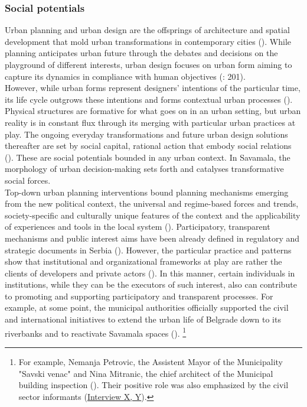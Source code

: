 \documentclass[11pt]{report}
\begin{document}
\subsubsection{Social potentials}

Urban planning and urban design are the offsprings of architecture and spatial development that mold urban transformations in contemporary cities (\citealt{rode_city_2006}).
While planning anticipates urban future through the debates and decisions on the playground of different interests, urban design focuses on urban form aiming to capture its dynamics in compliance with human objectives (\citealt{lynch_theory_1958}: 201).
\\

However, while urban forms represent designers' intentions of the particular time, its life cycle outgrows these intentions and forms contextual urban processes (\citealt{tonkiss_cities_2014}).
Physical structures are formative for what goes on in an urban setting, but urban reality is in constant flux through its merging with particular urban practices at play.
The ongoing everyday transformations and future urban design solutions thereafter are set by social capital, rational action that embody social relations (\citealt{coleman_social_1988}).
These are social potentials bounded in any urban context.
In Savamala, the morphology of urban decision-making sets forth and catalyses transformative social forces.
\\

Top-down urban planning interventions bound planning mechanisms emerging from the new political context, the universal and regime-based forces and trends, society-specific and culturally unique features of the context and the applicability of experiences and tools in the local system (\citealt{nedovic-budic_adjustment_2001}).
Participatory, transparent mechanisms and public interest aims have been already defined in regulatory and strategic documents in Serbia (\citealt{vujosevic_conundrum_2012}).
However, the particular practice and patterns show that institutional and organizational frameworks at play are rather the clients of developers and private actors (\citealt{mrdjenovic_tatjana_urban_2015}).
In this manner, certain individuals in institutions, while they can be the executors of such interest, also can contribute to promoting and supporting participatory and transparent processes.
For example, at some point, the municipal authorities officially supported the civil and international initiatives to extend the urban life of Belgrade down to its riverbanks and to reactivate Savamala spaces (\citealt{doytchinov_urban_2015}).
\footnote{For example, Nemanja Petrovic, the Assistent Mayor of the Municipality "Savski venac" and Nina Mitranic, the chief architect of the Municipal building inspection (\citealt{doytchinov_urban_2015}). Their positive role was also emphasized by the civil sector informants (\href{InterviewX}{Interview X, Y}).}
\\
\end{document}
